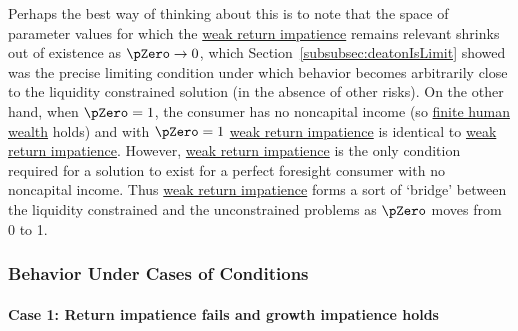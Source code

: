 \documentclass[\econtexRoot/BufferStockTheory]{subfiles}
\begin{document}
Perhaps the best way of thinking about this is to note that the space of parameter values for which the \hyperlink{WRIC}{weak return impatience}  remains relevant shrinks out of existence as $\pZero \rightarrow 0$, which Section~\ref{subsubsec:deatonIsLimit} showed was the precise limiting condition under which behavior becomes arbitrarily close to the liquidity constrained solution (in the absence of other risks).
On the other hand, when $\pZero = 1$, the consumer has no noncapital income (so \hyperlink{FHWC}{finite human wealth} holds) and with $\pZero=1$ \hyperlink{WRIC}{weak return impatience} is identical to \hyperlink{WRIC}{weak return impatience}.
However, \hyperlink{WRIC}{weak return impatience} is the only condition required for a solution to exist for a perfect foresight consumer with no noncapital income.
Thus \hyperlink{WRIC}{weak return impatience} forms a sort of `bridge' between the liquidity constrained and the unconstrained problems as $\pZero$ moves from 0 to 1.

\subsubsection{Behavior Under Cases of Conditions}\label{subsubsec:casesUC}

\hypertarget{IntuitionRIC}{}
\paragraph{Case 1: Return impatience fails and growth impatience holds} 
\end{document}
